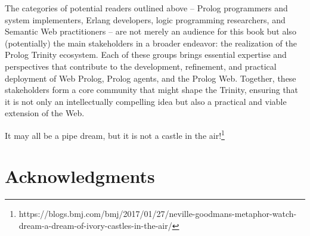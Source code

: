
The categories of potential readers outlined above -- Prolog programmers and system implementers, Erlang developers, logic programming researchers, and Semantic Web practitioners -- are not merely an audience for this book but also (potentially) the main stakeholders in a broader endeavor: the realization of the Prolog Trinity ecosystem. Each of these groups brings essential expertise and perspectives that contribute to the development, refinement, and practical deployment of Web Prolog, Prolog agents, and the Prolog Web. Together, these stakeholders form a core community that might shape the Trinity, ensuring that it is not only an intellectually compelling idea but also a practical and viable extension of the Web.

\medskip
\noindent It may all be a pipe dream, but it is not a castle in the air!\footnote{https://blogs.bmj.com/bmj/2017/01/27/neville-goodmans-metaphor-watch-dream-a-dream-of-ivory-castles-in-the-air/}


\section*{Acknowledgments}



%
%
%
%
%
%
%
%
%
% 
%

